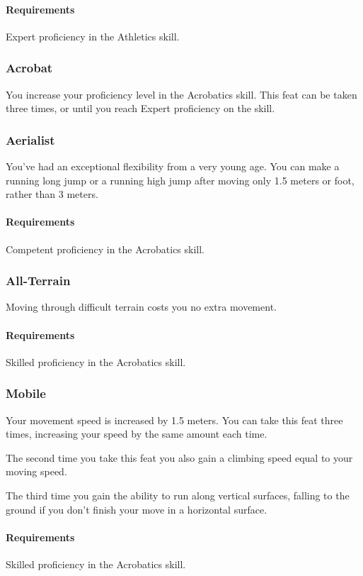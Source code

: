     \paragraph{Requirements} Expert proficiency in the Athletics skill.
\subsubsection{Acrobat} \label{feat::acrobat}
    You increase your proficiency level in the Acrobatics skill.
    This feat can be taken three times, or until you reach Expert proficiency on the skill.
\subsubsection{Aerialist} \label{feat::aerialist}
    You've had an exceptional flexibility from a very young age.
    You can make a running long jump or a running high jump after moving only 1.5 meters or foot, rather than 3 meters.
    \paragraph{Requirements} Competent proficiency in the Acrobatics skill.
\subsubsection{All-Terrain} \label{feat::allterrain}
    Moving through difficult terrain costs you no extra movement.
    \paragraph{Requirements} Skilled proficiency in the Acrobatics skill.
\subsubsection{Mobile} \label{feat::mobile}
    Your movement speed is increased by 1.5 meters.
    You can take this feat three times, increasing your speed by the same amount each time.

    The second time you take this feat you also gain a climbing speed equal to your moving speed.

    The third time you gain the ability to run along vertical surfaces, falling to the ground if you don't finish your move in a horizontal surface.
    \paragraph{Requirements} Skilled proficiency in the Acrobatics skill.
